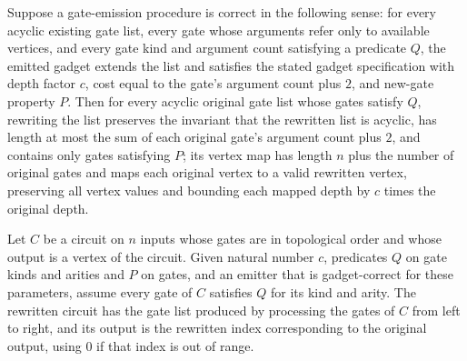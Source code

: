 \begin{theorem}
\label{BoolCircuit.rewriteGates_inv}
\leanok
{}
Suppose a gate-emission procedure is correct in the following sense: for every acyclic
existing gate list, every gate whose arguments refer only to available vertices, and
every gate kind and argument count satisfying a predicate $Q$, the emitted gadget
extends the list and satisfies the stated gadget specification with depth factor $c$,
cost equal to the gate's argument count plus $2$, and new-gate property $P$. Then for
every acyclic original gate list whose gates satisfy $Q$, rewriting the list preserves
the invariant that the rewritten list is acyclic, has length at most the sum of each
original gate's argument count plus $2$, and contains only gates satisfying $P$; its
vertex map has length $n$ plus the number of original gates and maps each original
vertex to a valid rewritten vertex, preserving all vertex values and bounding each
mapped depth by $c$ times the original depth.
\end{theorem}

\begin{definition}
\label{BoolCircuit.DAGCircuit.rewrite}
\leanok
{}
Let $C$ be a circuit on $n$ inputs whose gates are in topological order and whose output
is a vertex of the circuit. Given natural number $c$, predicates $Q$ on gate kinds and
arities and $P$ on gates, and an emitter that is gadget-correct for these parameters,
assume every gate of $C$ satisfies $Q$ for its kind and arity. The rewritten circuit has
the gate list produced by processing the gates of $C$ from left to right, and its output
is the rewritten index corresponding to the original output, using $0$ if that index is
out of range.
\end{definition}

